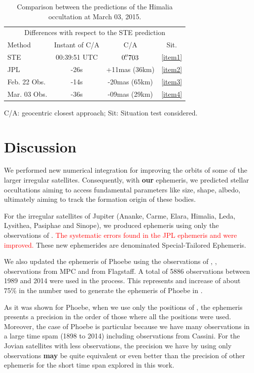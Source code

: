 \documentclass[useAMS,usenatbib]{mn2e}
\begin{document}
\begin{table}
\caption{\label{Tab: comparison-Himalia} Comparison between the predictions of the Himalia occultation at March 03, 2015.}
\begin{centering}
\begin{tabular}{lccc}
\hline  \hline
\multicolumn{4}{c}{Differences with respect to the STE prediction} \tabularnewline
Method  & Instant of C/A  & C/A & Sit.   \tabularnewline
\hline
STE & 00:39:51 UTC & $0\hbox{$.\!\!^{\prime\prime}$}703$ & \ref{item1} \tabularnewline
JPL & -26s & +11mas (36km) & \ref{item2} \tabularnewline %
Feb. 22 Obs. & -14s & -20mas (65km) & \ref{item3} \tabularnewline %
Mar. 03 Obs. & -36s & -09mas (29km) & \ref{item4} \tabularnewline %
\hline
\end{tabular}
\par\end{centering}
C/A: geocentric closest approach; Sit: Situation test considered.
\end{table}

\section{Discussion} \label{Sec: discussion}

We performed new numerical integration for improving the orbits of some of the larger irregular satellites. Consequently, with \textbf{our} ephemeris, we predicted stellar occultations aiming to access fundamental parameters like size, shape, albedo, ultimately aiming to track the formation origin of these bodies.

For the irregular satellites of Jupiter (Ananke, Carme, Elara, Himalia, Leda, Lysithea, Pasiphae and Sinope), we produced ephemeris using only the observations of . \textcolor{red}{The systematic errors found in the JPL ephemeris \citep{Jacobson2012} and \cite{Emelyanov2005} were improved.} These new ephemerides are denominated Special-Tailored Ephemeris.

We also updated the ephemeris of Phoebe \citep{Desmars2013} using the observations of , \cite{Peng2015}, observations from  MPC and from Flagstaff. A total of 5886 observations between 1989 and 2014 were used in the process. This represents and increase of about 75\% in the number used to generate the ephemeris of Phoebe in \cite{Desmars2013}.

As it was shown for Phoebe, when we use only the positions of , the ephemeris presents a precision in the order of those where all the positions were used. Moreover, the case of Phoebe is particular because we have many observations in a large time spam (1898 to 2014) including observations from Cassini. For the Jovian satellites with less observations, the precision we have by using only  observations \textbf{may} be quite equivalent or even better than the precision of other ephemeris for the short time span explored in this work.
\end{document}
